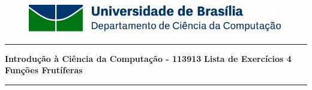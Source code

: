 \documentclass[a4paper, 12pt]{article}
\begin{document}
\begin{figure}[htb]
	\includegraphics[scale=0.9]{UnB_CiC_Logo.jpg}
\end{figure}
\noindent\rule{\textwidth}{0.4pt}
\begin{center}
	\textbf{{\Large Introdução à Ciência da Computação - 113913}} \newline \newline
	\textbf{{\large Lista de Exercícios 4} \\
	\vspace{9pt}
	{\large Funções Frutíferas}} \\
	\noindent\rule{\textwidth}{0.4pt}
	\newline
\end{center}
\end{document}
